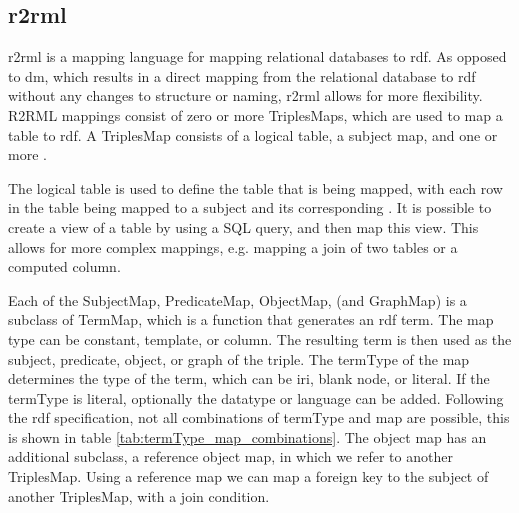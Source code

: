 \subsection{\acrshort{r2rml}}
\acrfull{r2rml} is a mapping language for mapping relational databases to \acrshort{rdf}. As opposed to \acrfull{dm}, which results in a direct mapping from the relational database to \acrshort{rdf} without any changes to structure or naming, \acrshort{r2rml} allows for more flexibility. R2RML mappings consist of zero or more TriplesMaps, which are used to map a table to \acrshort{rdf}. A TriplesMap consists of a logical table, a subject map, and one or more .

The logical table is used to define the table that is being mapped, with each row in the table being mapped to a subject and its corresponding . It is possible to create a view of a table by using a SQL query, and then map this view. This allows for more complex mappings, e.g. mapping a join of two tables or a computed column.


Each of the SubjectMap, PredicateMap, ObjectMap, (and GraphMap) is a subclass of TermMap, which is a function that generates an \acrshort{rdf} term. The map type can be constant, template, or column. The resulting term is then used as the subject, predicate, object, or graph of the triple. The termType of the map determines the type of the term, which can be \acrshort{iri}, blank node, or literal. If the termType is literal, optionally the datatype or language can be added. Following the \acrshort{rdf} specification, not all combinations of termType and map are possible, this is shown in table \ref{tab:termType_map_combinations}. The object map has an additional subclass, a reference object map, in which we refer to another TriplesMap. Using a reference map we can map a foreign key to the subject of another TriplesMap, with a join condition. \citep{r2rml}

